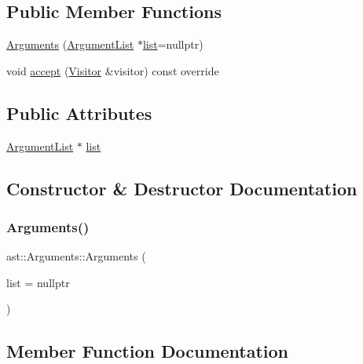 \subsection*{Public Member Functions}
\begin{DoxyCompactItemize}
\item 
\hyperlink{structast_1_1_arguments_a3b7b4129f023820800c4c868b4dde923}{Arguments} (\hyperlink{structast_1_1_argument_list}{Argument\+List} $\ast$\hyperlink{structast_1_1_arguments_ab37e8d216047d6b1cdbc7eee2b1bb2db}{list}=nullptr)
\item 
void \hyperlink{structast_1_1_arguments_a85dac892bff5ef780b46c3683868cdde}{accept} (\hyperlink{structast_1_1_visitor}{Visitor} \&visitor) const override
\end{DoxyCompactItemize}
\subsection*{Public Attributes}
\begin{DoxyCompactItemize}
\item 
\hyperlink{structast_1_1_argument_list}{Argument\+List} $\ast$ \hyperlink{structast_1_1_arguments_ab37e8d216047d6b1cdbc7eee2b1bb2db}{list}
\end{DoxyCompactItemize}


\subsection{Constructor \& Destructor Documentation}
\mbox{\label{structast_1_1_arguments_a3b7b4129f023820800c4c868b4dde923}} 
\subsubsection{\texorpdfstring{Arguments()}{Arguments()}}
{\footnotesize\ttfamily ast\+::\+Arguments\+::\+Arguments (\begin{DoxyParamCaption}\item[{\hyperlink{structast_1_1_argument_list}{Argument\+List} $\ast$}]{list = {\ttfamily nullptr} }\end{DoxyParamCaption})\hspace{0.3cm}{\ttfamily [inline]}}



\subsection{Member Function Documentation}
\mbox{\label{structast_1_1_arguments_a85dac892bff5ef780b46c3683868cdde}} 
